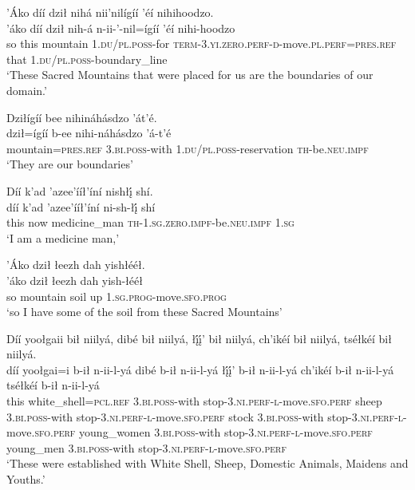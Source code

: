 \ea\label{ex:text4-12-1}
’Áko díí dził nihá nii’nilígíí ’éí nihihoodzo.\\
\gll ’áko	díí	dził	nih-á	n-ii-’-nil=ígíí	’éí	nihi-hoodzo\\
     so	this	mountain	1.\textsc{du}/\textsc{pl}.\textsc{poss}-for	\textsc{term}-3.\textsc{yi}.\textsc{zero}.\textsc{perf}-\textsc{d}-move.\textsc{pl}.\textsc{perf}=\textsc{pres}.\textsc{ref}	that	1.\textsc{du}/\textsc{pl}.\textsc{poss}-boundary\_line\\
\glt `These Sacred Mountains that were placed for us are the boundaries of our domain.'
\z

\ea\label{ex:text4-12-2}
Dziłígíí bee nihináhásdzo ’át’é.\\
\gll dził=ígíí	b-ee	nihi-náhásdzo	’á-t’é\\
     mountain=\textsc{pres}.\textsc{ref}	3.\textsc{bi}.\textsc{poss}-with	1.\textsc{du}/\textsc{pl}.\textsc{poss}-reservation	\textsc{th}-be.\textsc{neu}.\textsc{impf}\\
\glt `They are our boundaries'
\z

\ea\label{ex:text4-13-1}
Díí k’ad ’azee’ííł’íní nishłį́ shí.\\
\gll díí	k’ad	’azee’ííł’íní	ni-sh-łį́	shí\\
     this	now	medicine\_man	\textsc{th}-1.\textsc{sg}.\textsc{zero}.\textsc{impf}-be.\textsc{neu}.\textsc{impf}	1.\textsc{sg}\\
\glt `I am a medicine man,'
\z

\ea\label{ex:text4-13-2}
’Áko dził łeezh dah yishłééł.\\
\gll ’áko	dził	łeezh	dah	yish-łééł\\
     so	mountain	soil	up	1.\textsc{sg}.\textsc{prog}-move.\textsc{sfo}.\textsc{prog}\\
\glt `so I have some of the soil from these Sacred Mountains'
\z

\ea\label{ex:text4-13-3}
Díí yoołgaii bił niilyá, dibé bił niilyá, łį́į́’ bił niilyá, ch’ikéí bił niilyá, tséłkéí bił niilyá.\\
\gll díí	yoołgai=i	b-ił	n-ii-l-yá	dibé	b-ił	n-ii-l-yá	łį́į́’	b-ił	n-ii-l-yá	ch’ikéí	b-ił	n-ii-l-yá	tséłkéí	b-ił	n-ii-l-yá\\
     this	white\_shell=\textsc{pcl}.\textsc{ref}	3.\textsc{bi}.\textsc{poss}-with	stop-3.\textsc{ni}.\textsc{perf}-\textsc{l}-move.\textsc{sfo}.\textsc{perf}	sheep	3.\textsc{bi}.\textsc{poss}-with	stop-3.\textsc{ni}.\textsc{perf}-\textsc{l}-move.\textsc{sfo}.\textsc{perf}	stock	3.\textsc{bi}.\textsc{poss}-with	stop-3.\textsc{ni}.\textsc{perf}-\textsc{l}-move.\textsc{sfo}.\textsc{perf}	young\_women	3.\textsc{bi}.\textsc{poss}-with	stop-3.\textsc{ni}.\textsc{perf}-\textsc{l}-move.\textsc{sfo}.\textsc{perf}	young\_men	3.\textsc{bi}.\textsc{poss}-with	stop-3.\textsc{ni}.\textsc{perf}-\textsc{l}-move.\textsc{sfo}.\textsc{perf}\\
\glt `These were established with White Shell, Sheep, Domestic Animals, Maidens and Youths.'
\z

